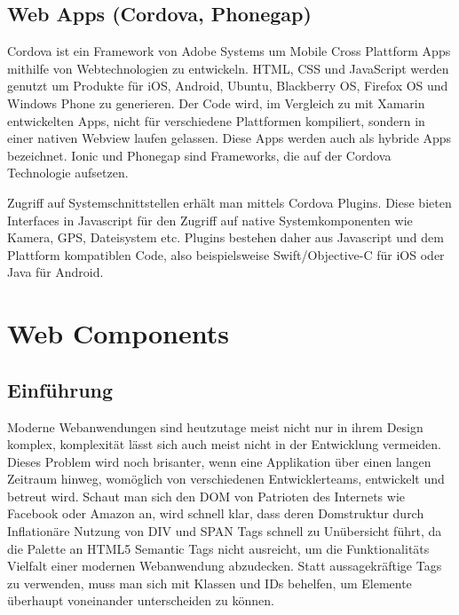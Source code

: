 \newpage


\subsection{Web Apps (Cordova, Phonegap)}

Cordova ist ein Framework von Adobe Systems um Mobile Cross Plattform Apps mithilfe von Webtechnologien zu entwickeln.
HTML, CSS und JavaScript werden genutzt um Produkte für iOS, Android, Ubuntu, Blackberry OS, Firefox OS und Windows Phone zu generieren.\cite{Cordo26:online}
Der Code wird, im Vergleich zu mit Xamarin entwickelten Apps, nicht für verschiedene Plattformen kompiliert,
sondern in einer nativen Webview laufen gelassen. Diese Apps werden auch als hybride Apps bezeichnet.
Ionic und Phonegap sind Frameworks, die auf der Cordova Technologie aufsetzen.

Zugriff auf Systemschnittstellen erhält man mittels Cordova Plugins. Diese bieten
Interfaces in Javascript für den Zugriff auf native Systemkomponenten wie Kamera, GPS, Dateisystem etc.
Plugins bestehen daher aus Javascript und dem Plattform kompatiblen Code,
also beispielsweise Swift/Objective-C für iOS oder Java für Android.

\vspace{1cm}

\vspace{1cm}

\newpage
\section{Web Components}


\subsection{Einführung}

Moderne Webanwendungen sind heutzutage meist nicht nur in ihrem Design komplex, komplexität lässt sich auch meist nicht in der Entwicklung
vermeiden. Dieses Problem wird noch brisanter, wenn eine Applikation über einen langen Zeitraum hinweg,
womöglich von verschiedenen Entwicklerteams, entwickelt und betreut wird. Schaut man sich den DOM von Patrioten des Internets wie Facebook oder Amazon an,
wird schnell klar, dass deren Domstruktur durch Inflationäre Nutzung von DIV und SPAN Tags schnell zu Unübersicht führt,
da die Palette an HTML5 Semantic Tags nicht ausreicht, um die Funktionalitäts Vielfalt einer modernen Webanwendung abzudecken.
Statt aussagekräftige Tags zu verwenden, muss man sich mit Klassen und IDs behelfen, um Elemente überhaupt voneinander unterscheiden zu können.
\cite{sitepoint-introduction-to-webcomponents}

